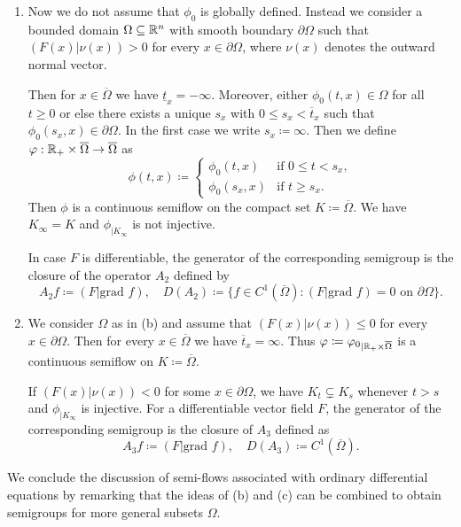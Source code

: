 \begin{example}
\begin{enumerate}[\upshape (i), wide, labelindent=.25em]
	\item 
	Now we do not assume that  $\phi_0$ is globally defined.
	Instead we consider a bounded domain $\Omega \subseteq \mathbb{R}^n$ with smooth boundary $\partial\Omega$ such that $(F(x)|\nu(x)) > 0$ for every $x \in \partial\Omega$, where $\nu(x)$ denotes the outward normal vector.
	
	Then for $x \in \overline{\Omega}$ we have $\underline{t}_{x} = -\infty$.
	Moreover, either $\phi_{0}(t,x) \in \Omega$ for all $t \geq 0$ or else there exists a unique $s_{x}$ with $0 \leq s_{x} < \overline{t}_{x}$ such that $\phi_{0}(s_{x},x) \in \partial\Omega$.
	In the first case we write $s_{x} \coloneq \infty$.
	Then we define $\phi: \R_{+} \times \overline{\Omega} \to \overline{\Omega}$ as 
	\[\phi(t,x) \coloneq \begin{cases}
		\phi_{0}(t,x) & \text{if } 0 \leq t < s_{x}  ,  \\
		\phi_{0}(s_{x},x) & \text{if } t \geq s_{x} .
	\end{cases}\]
	Then $\phi$ is a continuous semiflow on the compact set $K \coloneq \overline{\Omega}$.
	We have $K_{\infty} = K$ and $\phi_{|K_{\infty}}$ is not injective.
	
	In case $F$ is differentiable, the generator of the corresponding semigroup is the closure of the operator $A_{2}$ defined by
	\[
	A_{2}f \coloneq (F|\text{grad }f), \quad D(A_{2}) \coloneq \{f \in C^1(\overline{\Omega}) \colon (F|\text{grad }f) = 0 \text{ on } \partial\Omega\}.	
	\]
	
	\item 
	We consider $\Omega$ as in (b) and assume that $(F(x)|\nu(x)) \leq 0$ for every $x \in \partial\Omega$.
	Then for every $x \in \overline{\Omega}$ we have $\overline{t}_{x} = \infty$.
	Thus $\phi \coloneq {\phi_{0}}_{|\R_{+}\times\overline{\Omega}}$ is a continuous semiflow on $K \coloneq \overline{\Omega}$.
	
	If\/ $(F(x)|\nu(x)) < 0$ for some $x \in \partial\Omega$, we have $K_{t} \subsetneq K_{s}$ whenever $t > s$ and $\phi_{\vert K_{\infty}}$ is injective.
	For a differentiable vector field $F$, the generator of the corresponding semigroup is the closure of\/ $A_{3}$ defined as
	\[
	A_{3}f \coloneq (F|\text{grad }f), \quad D(A_{3}) \coloneq C^1(\overline{\Omega}).
	\]
\end{enumerate}
\end{example}
We conclude the discussion of semi-flows associated with ordinary differential equations by remarking that the ideas of (b) and (c) can be combined to obtain semigroups for more general subsets $\Omega$.

